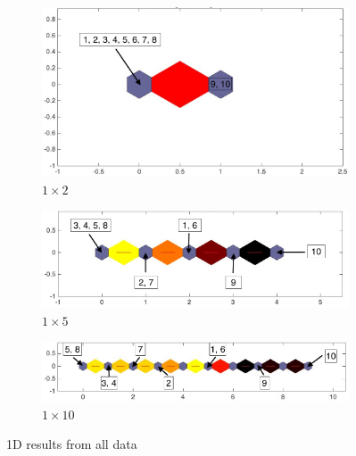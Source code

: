 \begin{figure}
                \begin{subfigure}[b]{0.5\textwidth}
                    \centering
                    \includegraphics[width=\textwidth]{../images/M31/all/dist1by2.jpeg}
                    \caption{$1\times2$}
                     \label{fig: 1by2all}
                \end{subfigure}
                \hfill
                \begin{subfigure}[b]{0.5\textwidth}
                     \includegraphics[width=\textwidth]{../images/M31/all/dist1by5.jpeg}
                     \caption{$1\times5$}
                     \label{fig: 1by5all}
                \end{subfigure}
                \hfill
                \hfill
                \begin{subfigure}[b]{0.5\textwidth}
                     \includegraphics[width=\textwidth]{../images/M31/all/dist1by10.jpeg}
                     \caption{$1\times10$}
                     \label{fig: 1by10all}
                \end{subfigure}
                \caption{1D results from all data}
            \end{figure}

